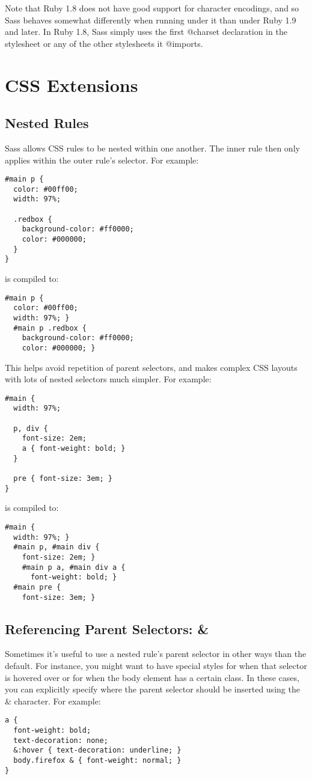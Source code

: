 \documentclass[10pt]{article}
\begin{document}
 Note that Ruby 1.8 does not have good support for character encodings, and so Sass behaves somewhat differently when running under it than under Ruby 1.9 and later. In Ruby 1.8, Sass simply uses the first @charset declaration in the stylesheet or any of the other stylesheets it @imports.
\section{CSS Extensions}
\subsection{Nested Rules}


 Sass allows CSS rules to be nested within one another. The inner rule then only applies within the outer rule’s selector. For example:
\begin{verbatim}
#main p {
  color: #00ff00;
  width: 97%;

  .redbox {
    background-color: #ff0000;
    color: #000000;
  }
}
\end{verbatim}


 is compiled to:
\begin{verbatim}
#main p {
  color: #00ff00;
  width: 97%; }
  #main p .redbox {
    background-color: #ff0000;
    color: #000000; }
\end{verbatim}


 This helps avoid repetition of parent selectors, and makes complex CSS layouts with lots of nested selectors much simpler. For example:
\begin{verbatim}
#main {
  width: 97%;

  p, div {
    font-size: 2em;
    a { font-weight: bold; }
  }

  pre { font-size: 3em; }
}
\end{verbatim}


 is compiled to:
\begin{verbatim}
#main {
  width: 97%; }
  #main p, #main div {
    font-size: 2em; }
    #main p a, #main div a {
      font-weight: bold; }
  #main pre {
    font-size: 3em; }
\end{verbatim}
\subsection{Referencing Parent Selectors: \&}


 Sometimes it’s useful to use a nested rule’s parent selector in other ways than the default. For instance, you might want to have special styles for when that selector is hovered over or for when the body element has a certain class. In these cases, you can explicitly specify where the parent selector should be inserted using the \& character. For example:
\begin{verbatim}
a {
  font-weight: bold;
  text-decoration: none;
  &:hover { text-decoration: underline; }
  body.firefox & { font-weight: normal; }
}
\end{verbatim}
\end{document}
